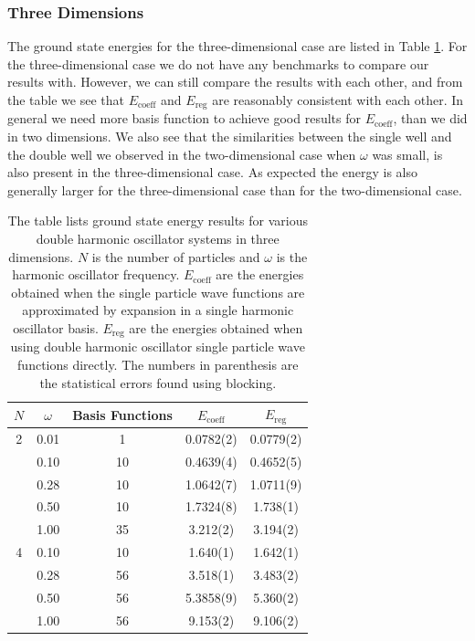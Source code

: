 \documentclass[../main.tex]{subfiles}
\begin{document}
\subsubsection{Three Dimensions}

The ground state energies for the three-dimensional case are listed in Table \ref{tab: EnergiesDHO3D}. For the three-dimensional case we do not have any benchmarks to compare our results with. However, we can still compare the results with each other, and from the table we see that $E_\textrm{coeff}$ and $E_\textrm{reg}$ are reasonably consistent with each other. In general we need more basis function to achieve good results for $E_\textrm{coeff}$, than we did in two dimensions. We also see that the similarities between the single well and the double well we observed in the two-dimensional case when $\omega$ was small, is also present in the three-dimensional case. As expected the energy is also generally larger for the three-dimensional case than for the two-dimensional case.

\begin{table}[!ht]
  \centering
  \begin{tabular}{c c c c c}
    \hline
    \hline
    $N$ & $\omega$ & Basis Functions & $E_\textrm{coeff}$ & $E_\textrm{reg}$ \\*
    \hline
    2 & 0.01 & 1 & 0.0782(2) & 0.0779(2) \\*
      & 0.10 & 10 & 0.4639(4) & 0.4652(5) \\*
      & 0.28 & 10 & 1.0642(7) & 1.0711(9) \\*
      & 0.50 & 10 & 1.7324(8) & 1.738(1) \\*
      & 1.00 & 35 & 3.212(2) & 3.194(2) \vspace{2 mm}\\*
      
    4 & 0.10 & 10 & 1.640(1) & 1.642(1) \\*
      & 0.28 & 56 & 3.518(1) & 3.483(2) \\*
      & 0.50 & 56 & 5.3858(9) & 5.360(2) \\*
      & 1.00 & 56 & 9.153(2) & 9.106(2) \\*
    \hline
    \hline
  \end{tabular}
  \caption{The table lists ground state energy results for various double harmonic oscillator systems in three dimensions. $N$ is the number of particles and $\omega$ is the harmonic oscillator frequency. $E_\textrm{coeff}$ are the energies obtained when the single particle wave functions are approximated by expansion in a single harmonic oscillator basis. $E_\textrm{reg}$ are the energies obtained when using double harmonic oscillator single particle wave functions directly. The numbers in parenthesis are the statistical errors found using blocking.}
  \label{tab: EnergiesDHO3D}
\end{table}
\end{document}

